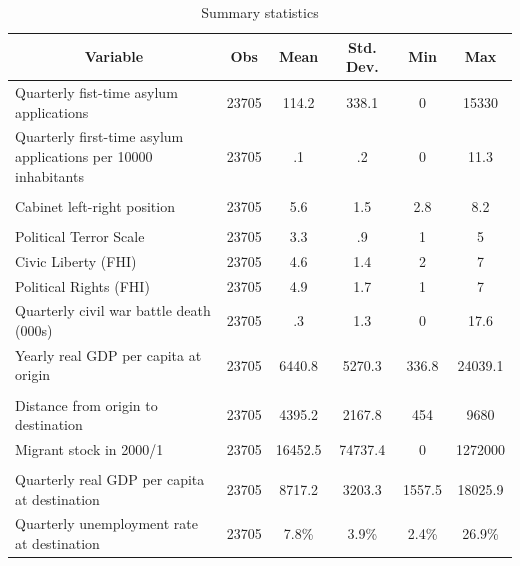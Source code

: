 \documentclass[a4paper,12pt]{article}
\begin{document}
\begin{table}[htbp]\centering \caption{Summary statistics\label{sumstat}}
\begin{tabular}{p{8cm} c c c c c }\hline\hline
\multicolumn{1}{c}{Variable} & Obs & Mean & Std. Dev.
 & Min & Max  \\ \hline
Quarterly fist-time asylum applications & 23705 & 114.2 & 338.1 & 0 & 15330  \\
[0.5em]
Quarterly first-time asylum applications per 10000 inhabitants & 23705 & .1 & .2 & 0 & 11.3  \\
&\\
Cabinet left-right position  & 23705 & 5.6 & 1.5 & 2.8 & 8.2  \\
&\\
Political Terror Scale & 23705 & 3.3 & .9 & 1 & 5  \\
[0.5em]
Civic Liberty (FHI) & 23705 & 4.6 & 1.4 & 2 & 7  \\
[0.5em]
Political Rights (FHI) & 23705 & 4.9 & 1.7 & 1 & 7  \\
[0.5em]
Quarterly civil war battle death (000s) & 23705 & .3 & 1.3 & 0 & 17.6  \\
[0.5em]
Yearly real GDP per capita at origin & 23705 & 6440.8 & 5270.3 & 336.8 & 24039.1  \\

&\\
Distance from origin to destination & 23705 & 4395.2 & 2167.8 & 454 & 9680  \\
[0.5em]
Migrant stock in 2000/1 & 23705 & 16452.5 & 74737.4 & 0 & 1272000  \\

&\\
Quarterly real GDP per capita at destination & 23705 & 8717.2 & 3203.3 & 1557.5 & 18025.9  \\
[0.5em]
Quarterly unemployment rate at destination & 23705 & 7.8\% & 3.9\% & 2.4\% & 26.9\%  \\
\hline \hline
\end{tabular}
\end{table}
\end{document}
